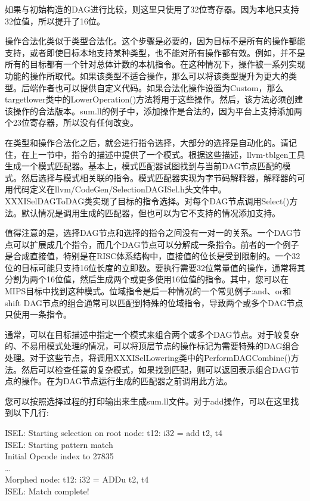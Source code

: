 如果与初始构造的DAG进行比较，则这里只使用了32位寄存器。因为本地只支持32位值，所以提升了16位。\par

操作合法化类似于类型合法化。这个步骤是必要的，因为目标不是所有的操作都能支持，或者即使目标本地支持某种类型，也不能对所有操作都有效。例如，并不是所有的目标都有一个针对总体计数的本机指令。在这种情况下，操作被一系列实现功能的操作所取代。如果该类型不适合操作，那么可以将该类型提升为更大的类型。后端作者也可以提供自定义代码。如果合法化操作设置为Custom，那么targetlower类中的LowerOperation()方法将用于这些操作。然后，该方法必须创建该操作的合法版本。sum.ll的例子中，添加操作是合法的，因为平台上支持添加两个23位寄存器，所以没有任何改变。\par

在类型和操作合法化之后，就会进行指令选择，大部分的选择是自动化的。请记住，在上一节中，指令的描述中提供了一个模式。根据这些描述，llvm-tblgen工具生成一个模式匹配器。基本上，模式匹配器试图找到与当前DAG节点匹配的模式。然后选择与模式相关联的指令。模式匹配器实现为字节码解释器，解释器的可用代码定义在llvm/CodeGen/SelectionDAGISel.h头文件中。XXXISelDAGToDAG类实现了目标的指令选择。对每个DAG节点调用Select()方法。默认情况是调用生成的匹配器，但也可以为它不支持的情况添加支持。\par

值得注意的是，选择DAG节点和选择的指令之间没有一对一的关系。一个DAG节点可以扩展成几个指令，而几个DAG节点可以分解成一条指令。前者的一个例子是合成直接值，特别是在RISC体系结构中，直接值的位长是受到限制的。一个32位的目标可能只支持16位长度的立即数。要执行需要32位常量值的操作，通常将其分割为两个16位值，然后生成两个或更多使用16位值的指令。其中，您可以在MIPS目标中找到这种模式。位域指令是后一种情况的一个常见例子:and、or和shift DAG节点的组合通常可以匹配到特殊的位域指令，导致两个或多个DAG节点只使用一条指令。\par

通常，可以在目标描述中指定一个模式来组合两个或多个DAG节点。对于较复杂的、不易用模式处理的情况，可以将顶层节点的操作标记为需要特殊的DAG组合处理。对于这些节点，将调用XXXISelLowering类中的PerformDAGCombine()方法。然后可以检查任意的复杂模式，如果找到匹配，则可以返回表示组合DAG节点的操作。在为DAG节点运行生成的匹配器之前调用此方法。\par

您可以按照选择过程的打印输出来生成sum.ll文件。对于add操作，可以在这里找到以下几行:\par

\begin{tcolorbox}[colback=white,colframe=black]
ISEL: Starting selection on root node: t12: i32 = add t2, t4 \\
ISEL: Starting pattern match \\
\hspace*{0.5cm}Initial Opcode index to 27835 \\
\hspace*{0.5cm}… \\
\hspace*{0.5cm}Morphed node: t12: i32 = ADDu t2, t4 \\
ISEL: Match complete!
\end{tcolorbox}

